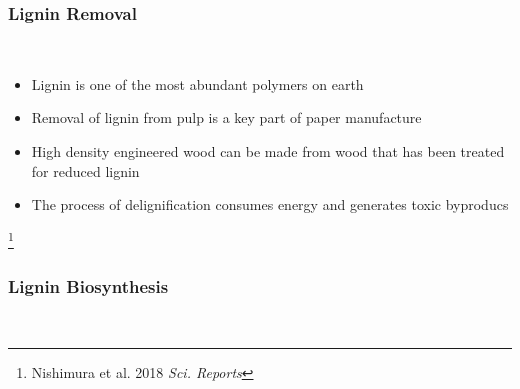 \documentclass[xcolor=dvipsnames]{beamer}
\newcommand\blfootnote[1]{%
	\begingroup
	\renewcommand\thefootnote{}\footnote{#1}%
	\addtocounter{footnote}{-1}%
	\endgroup
}
\begin{document}
\begin{frame}
	\frametitle{Lignin Removal}
		\\	
\flushleft
\scriptsize
\begin{itemize}
				\item[]	Lignin is one of the most abundant polymers on earth	
			\item[] Removal of lignin from pulp is a key part of paper manufacture
			\item[] High density engineered wood can be made from wood that has been treated for reduced lignin 
			\item[] The process of delignification consumes energy and generates toxic byproducs
			\end{itemize}
\blfootnote{Nishimura et al. 2018 \textit{Sci. Reports}	}
\end{frame}


\begin{frame}
	\frametitle{Lignin Biosynthesis}
					\\


\end{frame}
\end{document}

